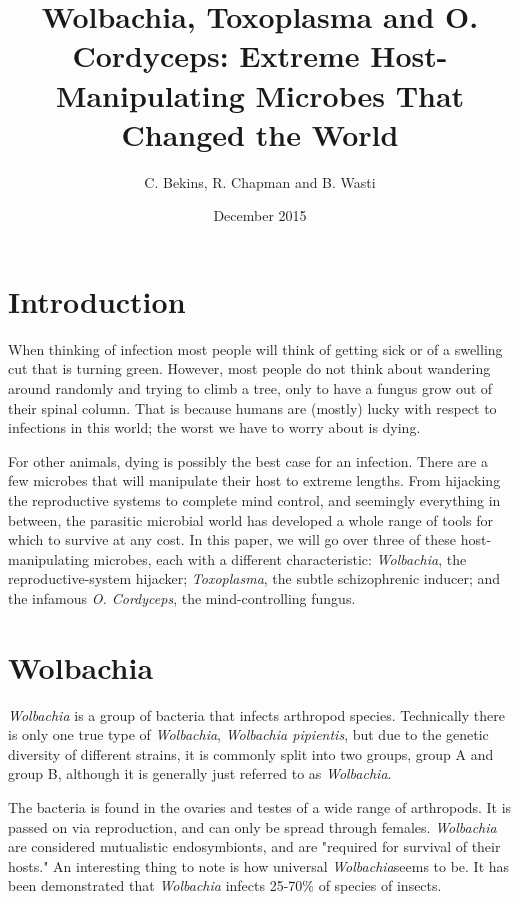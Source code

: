 \documentclass[twocolumn]{article}
\begin{document}
\title{Wolbachia, Toxoplasma and O. Cordyceps: Extreme Host-Manipulating Microbes That Changed the World}
    \author{C. Bekins, R. Chapman and B. Wasti}
    \date{December 2015}
    \maketitle

\section*{Introduction}
When thinking of infection most people will think of getting sick or of a swelling cut that is turning green. However, most people do not think about wandering around randomly and trying to climb a tree, only to have a fungus grow out of their spinal column. That is because humans are (mostly) lucky with respect to infections in this world; the worst we have to worry about is dying.

For other animals, dying is possibly the best case for an infection. There are a few microbes that will manipulate their host to extreme lengths. From hijacking the reproductive systems to complete mind control, and seemingly everything in between, the parasitic microbial world has developed a whole range of tools for which to survive at any cost. In this paper, we will go over three of these host-manipulating microbes, each with a different characteristic: \textit{Wolbachia}, the reproductive-system hijacker; \textit{Toxoplasma}, the subtle schizophrenic inducer; and the infamous \textit{O. Cordyceps}, the mind-controlling fungus. 

\section*{Wolbachia}
\textit{Wolbachia} is a group of bacteria that infects arthropod species. Technically there is only one true type of \textit{Wolbachia}, \textit{Wolbachia pipientis}, but due to the genetic diversity of different strains, it is commonly split into two groups, group A and group B, although it is generally just referred to as \textit{Wolbachia}.

The bacteria is found in the ovaries and testes of a wide range of arthropods.\cite{Wbio} It is passed on via reproduction, and can only be spread through females. \textit{Wolbachia} are considered mutualistic endosymbionts, and are "required for survival of their hosts."\cite{Wdisc_nem} An interesting thing to note is how universal \textit{Wolbachia}seems to be. It has been demonstrated that \textit{Wolbachia} infects 25-70\% of species of insects.\cite{Wdisc_nem}
\end{document}
